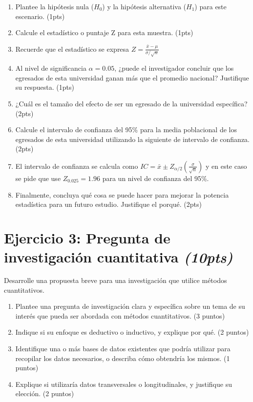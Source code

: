 \documentclass[12pt]{article}
\begin{document}
\begin{enumerate}
    \item[a.] Plantee la hipótesis nula ($H_0$) y la hipótesis alternativa ($H_1$) para este escenario. (1pts)
    \item[b.] Calcule el estadístico o puntaje Z para esta muestra. (1pts)
    \item[] Recuerde que el estadístico se expresa $Z = \frac{\bar{x} - \mu}{\sigma / \sqrt{n}}$
    \item[c.] Al nivel de significancia  $\alpha = 0.05$, ¿puede el investigador concluir que los egresados de esta universidad ganan más que el promedio nacional? Justifique su respuesta. (1pts)
    \item[ch.] ¿Cuál es el tamaño del efecto de ser un egresado de la universidad específica? (2pts)
    \item[d.] Calcule el intervalo de confianza del 95\% para la media poblacional de los egresados de esta universidad utilizando la siguiente de intervalo de confianza. (2pts)
    \item[] El intervalo de confianza se calcula como $IC = \bar{x} \pm Z_{\alpha/2} \left( \frac{\sigma}{\sqrt{n}} \right) $ y en este caso se pide que use  $Z_{0.025} = 1.96$  para un nivel de confianza del 95\%.
    \item[e.] Finalmente, concluya qué cosa se puede hacer para mejorar la potencia estadística para un futuro estudio. Justifique el porqué. (2pts)
\end{enumerate}

\section*{Ejercicio 3: Pregunta de investigación cuantitativa \textit{(10pts)}} 
\noindent
Desarrolle una propuesta breve para una investigación que utilice métodos cuantitativos.
\begin{enumerate}
    \item[a.] Plantee una pregunta de investigación clara y específica sobre un tema de su interés que pueda ser abordada con métodos cuantitativos. (3 puntos)
    \item[b.] Indique si su enfoque es deductivo o inductivo, y explique por qué. (2 puntos) 
    \item[c.] Identifique una o más bases de datos existentes que podría utilizar para recopilar los datos necesarios, o describa cómo obtendría los mismos. (1 puntos)
    \item[ch.]  Explique si utilizaría datos transversales  o longitudinales, y justifique su elección. (2 puntos)
\end{enumerate}
\end{document}
